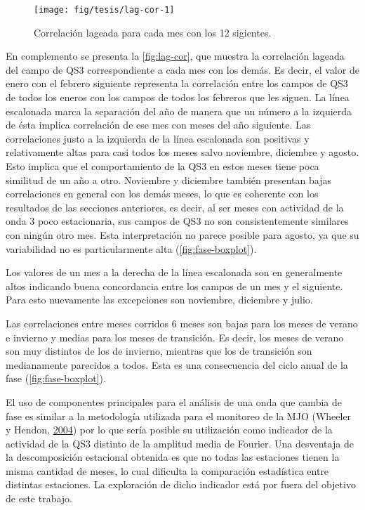 \documentclass[spanish,a4paper,12pt]{book}
\begin{document}
\begin{figure*}
\texttt{[image: fig/tesis/lag-cor-1]} \caption{Correlación lageada para cada mes con los 12 sigientes.}\label{fig:lag-cor}
\end{figure*}

En complemento se presenta la \autoref{fig:lag-cor}, que muestra la
correlación lageada del campo de QS3 correspondiente a cada mes con los
demás. Es decir, el valor de enero con el febrero siguiente representa
la correlación entre los campos de QS3 de todos los eneros con los
campos de todos los febreros que les siguen. La línea escalonada marca
la separación del año de manera que un número a la izquierda de ésta
implica correlación de ese mes con meses del año siguiente. Las
correlaciones justo a la izquierda de la línea escalonada son positivas
y relativamente altas para casi todos los meses salvo noviembre,
diciembre y agosto. Esto implica que el comportamiento de la QS3 en
estos meses tiene poca similitud de un año a otro. Noviembre y diciembre
también presentan bajas correlaciones en general con los demás meses, lo
que es coherente con los resultados de las secciones anteriores, es
decir, al ser meses con actividad de la onda 3 poco estacionaria, sus
campos de QS3 no son consistentemente similares con ningún otro mes.
Esta interpretación no parece posible para agosto, ya que su
variabilidad no es particularmente alta (\autoref{fig:fase-boxplot}).

Los valores de un mes a la derecha de la línea escalonada son en
generalmente altos indicando buena concordancia entre los campos de un
mes y el siguiente. Para esto nuevamente las excepciones son noviembre,
diciembre y julio.

Las correlaciones entre meses corridos 6 meses son bajas para los meses
de verano e invierno y medias para los meses de transición. Es decir,
los meses de verano son muy distintos de los de invierno, mientras que
los de transición son medianamente parecidos a todos. Esta es una
consecuencia del ciclo anual de la fase (\autoref{fig:fase-boxplot}).

El uso de componentes principales para el análisis de una onda que
cambia de fase es similar a la metodología utilizada para el monitoreo
de la MJO (Wheeler y Hendon, \protect\hyperlink{ref-Wheeler2004}{2004})
por lo que sería posible su utilización como indicador de la actividad
de la QS3 distinto de la amplitud media de Fourier. Una desventaja de la
descomposición estacional obtenida es que no todas las estaciones tienen
la misma cantidad de meses, lo cual dificulta la comparación estadística
entre distintas estaciones. La exploración de dicho indicador está por
fuera del objetivo de este trabajo.
\end{document}
